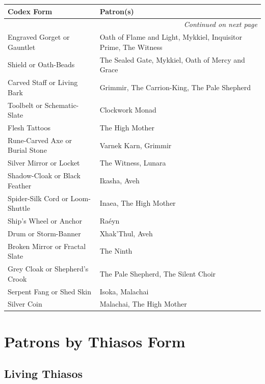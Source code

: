 \begin{longtable}{|p{4cm}|p{12cm}|}
\hline
\textbf{Codex Form} & \textbf{Patron(s)} \\
\hline
\endhead
\hline
\multicolumn{2}{|r|}{\textit{Continued on next page}} \\
\endfoot
\hline
\endlastfoot
Engraved Gorget or Gauntlet & Oath of Flame and Light, Mykkiel, Inquisitor Prime, The Witness \\
Shield or Oath-Beads & The Sealed Gate, Mykkiel, Oath of Mercy and Grace \\
Carved Staff or Living Bark & Grimmir, The Carrion-King, The Pale Shepherd \\
Toolbelt or Schematic-Slate & Clockwork Monad \\
Flesh Tattoos & The High Mother \\
Rune-Carved Axe or Burial Stone & Varnek Karn, Grimmir \\
Silver Mirror or Locket & The Witness, Lunara \\
Shadow-Cloak or Black Feather & Ikasha, Aveh \\
Spider-Silk Cord or Loom-Shuttle & Inaea, The High Mother \\
Ship's Wheel or Anchor & Raéyn \\
Drum or Storm-Banner & Xhak'Thul, Aveh \\
Broken Mirror or Fractal Slate & The Ninth \\
Grey Cloak or Shepherd's Crook & The Pale Shepherd, The Silent Choir \\
Serpent Fang or Shed Skin & Isoka, Malachai \\
Silver Coin & Malachai, The High Mother \\
\hline
\end{longtable}

\section{Patrons by Thiasos Form}

\subsection{Living Thiasos}

